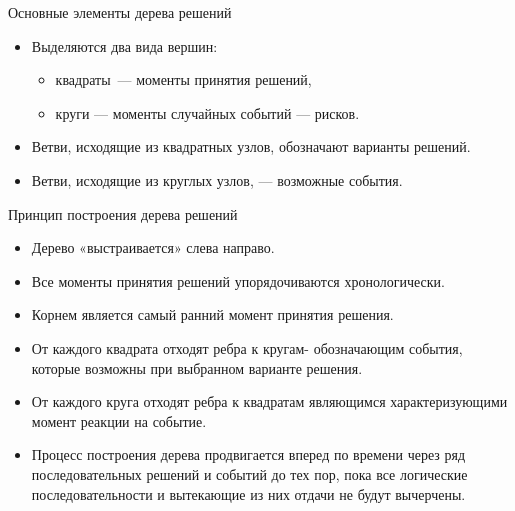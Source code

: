 \documentclass[unicode,11pt,notheorems]{beamer}
\begin{document}
\begin{frame}{Основные элементы дерева решений}
\begin{itemize}
\item 
	Выделяются два вида вершин:
	\begin{itemize}
	\item квадраты~--- моменты принятия решений, 
	\item круги --- моменты случайных событий --- рисков. 	
	\end{itemize}
\item 
	Ветви, исходящие из квадратных узлов, обозначают варианты решений.
\item 
	Ветви, исходящие из круглых узлов, --- возможные события.
\end{itemize}
\end{frame}
\begin{frame}{Принцип построения дерева решений}
\begin{itemize}
\item
	Дерево «выстраивается» слева направо. 
\item 
	Все моменты принятия решений упорядочиваются хронологически.
\item 
	Корнем является самый ранний момент принятия решения.
\item 
	От каждого квадрата отходят ребра к кругам- обозначающим события, которые возможны при выбранном варианте решения.
\item 
	От каждого круга отходят ребра к квадратам являющимся характеризующими момент реакции на событие.
\item 
	Процесс построения дерева продвигается вперед по времени через ряд последовательных решений и событий до тех пор, пока все логические последовательности и вытекающие из них отдачи не будут вычерчены.
\end{itemize}
\end{frame}
\end{document}
